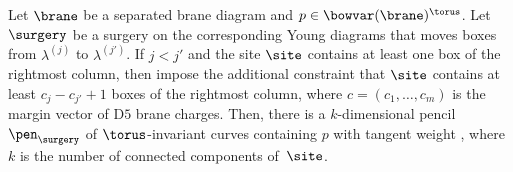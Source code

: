 \begin{Lemma} \label{lemma:Young_curves}
Let $\brane$ be a separated brane diagram and $p\in\bowvar(\brane)^\torus$. Let $\surgery$ be a surgery on the corresponding Young diagrams that moves boxes from $\lambda^{(j)}$ to $\lambda^{(j')}$. If $j<j'$ and the site $\site$ contains at least one box of the rightmost column, then impose the additional constraint that $\site$ contains at least $c_j-c_{j'}+1$ boxes of the rightmost column, where $c=(c_1,\dots ,c_m)$ is the margin vector of D$5$ brane charges. Then, there is a $k$-dimensional pencil $\pen_\surgery$ of $\torus$-invariant curves containing $p$ with tangent weight
,
where $k$ is the number of connected components of~$\site$.
\end{Lemma}

